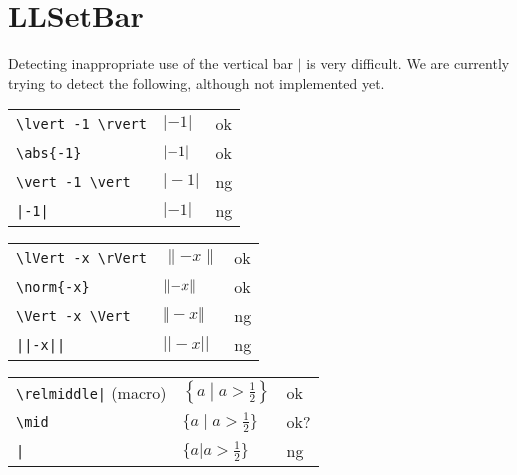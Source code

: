 \documentclass[a4paper]{article}
\newcommand{\tA}[1]{\textcolor{cA}{#1}}
\newcommand{\tC}[1]{\textcolor{cC}{#1}}
\newcommand{\tD}[1]{\textcolor{cD}{#1}}
\begin{document}
\renewcommand\thesection{Appendix \Alph{section}}

\section{LLSetBar}

Detecting inappropriate use of the vertical bar $|$ is very difficult.
We are currently trying to detect the following, although not implemented yet.

\begin{table}[H]
	\centering
	\begin{tabular}{lll}
		\verb#\lvert -1 \rvert# & $\lvert -1 \rvert$ & \tA{ok} \\
		\verb#\abs{-1}#         & $\abs{-1}$         & \tA{ok} \\
		\verb#\vert -1 \vert#   & $\vert -1 \vert$   & \tD{ng} \\
		\verb#|-1|#             & $|-1|$             & \tD{ng} \\
	\end{tabular}
\end{table}


\begin{table}[H]
	\centering
	\begin{tabular}{lll}
		\verb#\lVert -x \rVert# & $\lVert -x \rVert$ & \tA{ok} \\
		\verb#\norm{-x}#        & $\norm{-x}$        & \tA{ok} \\
		\verb#\Vert -x \Vert#   & $\Vert -x \Vert$   & \tD{ng} \\
		\verb#||-x||#           & $||-x||$           & \tD{ng} \\
	\end{tabular}
\end{table}

\begin{table}[H]
	\centering
	\begin{tabular}{lll}
		\verb#\relmiddle|# (macro) & $\displaystyle{\left\{ a \mathrel{}\middle|\mathrel{} a>\frac{1}{2} \right\}}$ & \tA{ok}  \\
		\verb#\mid#                & $\displaystyle{\{ a \mid a>\frac{1}{2} \}}$                                    & \tC{ok?} \\
		\verb#|#                   & $\displaystyle{\{ a | a>\frac{1}{2} \}}$                                       & \tD{ng}
	\end{tabular}
\end{table}
\end{document}
